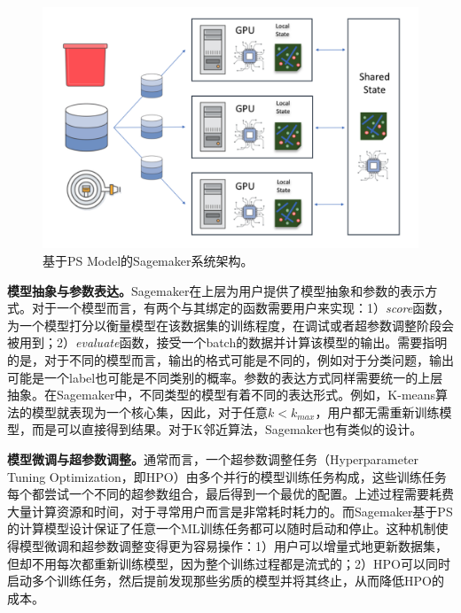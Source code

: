 \begin{figure}[h]
    \centerline{\includegraphics[width=\textwidth]{figures/sagemaker-ps.png}}
    \caption{基于PS Model的Sagemaker系统架构。}
    \label{sagemaker_ps}
\end{figure}

\textbf{模型抽象与参数表达。}Sagemaker在上层为用户提供了模型抽象和参数的表示方式。对于一个模型而言，有两个与其绑定的函数需要用户来实现：1）\textit{score}函数，为一个模型打分以衡量模型在该数据集的训练程度，在调试或者超参数调整阶段会被用到；2）\textit{evaluate}函数，接受一个batch的数据并计算该模型的输出。需要指明的是，对于不同的模型而言，输出的格式可能是不同的，例如对于分类问题，输出可能是一个label也可能是不同类别的概率。参数的表达方式同样需要统一的上层抽象。在Sagemaker中，不同类型的模型有着不同的表达形式。例如，K-means算法的模型就表现为一个核心集，因此，对于任意$k<k_{max}$，用户都无需重新训练模型，而是可以直接得到结果。对于K邻近算法，Sagemaker也有类似的设计。


\textbf{模型微调与超参数调整。}通常而言，一个超参数调整任务（Hyperparameter Tuning Optimization，即HPO）\parencite{bardenet2013collaborative}由多个并行的模型训练任务构成，这些训练任务每个都尝试一个不同的超参数组合，最后得到一个最优的配置。上述过程需要耗费大量计算资源和时间，对于寻常用户而言是非常耗时耗力的。而Sagemaker基于PS的计算模型设计保证了任意一个ML训练任务都可以随时启动和停止。这种机制使得模型微调和超参数调整变得更为容易操作：1）用户可以增量式地更新数据集，但却不用每次都重新训练模型，因为整个训练过程都是流式的；2）HPO可以同时启动多个训练任务，然后提前发现那些劣质的模型并将其终止，从而降低HPO的成本。

